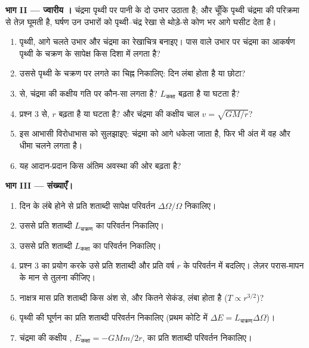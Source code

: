 \begin{problem}
\medskip
\noindent\textbf{भाग II --- ज्वारीय ।}
चंद्रमा पृथ्वी पर पानी के दो उभार उठाता है; और चूँकि पृथ्वी चंद्रमा की
परिक्रमा से तेज़ घूमती है, घर्षण उन उभारों को पृथ्वी--चंद्र रेखा से थोड़े-से
कोण भर आगे घसीट देता है।
\begin{enumerate}[resume]
  \item पृथ्वी, आगे चलते उभार और चंद्रमा का रेखाचित्र बनाइए। पास वाले
        उभार पर चंद्रमा का आकर्षण पृथ्वी के चक्रण के सापेक्ष किस दिशा में
        लगता है?
  \item उससे पृथ्वी के चक्रण पर लगते  का चिह्न निकालिए: दिन लंबा
        होता है या छोटा?
  \item {} से, चंद्रमा की कक्षीय गति पर कौन-सा 
        लगता है? $L_{\text{कक्षा}}$ बढ़ता है या घटता है?
  \item प्रश्न 3 से, $r$ बढ़ता है या घटता है? और चंद्रमा की कक्षीय चाल
        $v = \sqrt{GM/r}$?
  \item इस आभासी विरोधाभास को सुलझाइए: चंद्रमा को आगे धकेला जाता है, फिर
        भी अंत में वह और धीमा चलने लगता है।
  \item यह आदान-प्रदान किस अंतिम अवस्था की ओर बढ़ता है?
\end{enumerate}

\medskip
\noindent\textbf{भाग III --- संख्याएँ।}
\begin{enumerate}[resume]
  \item दिन के लंबे होने से प्रति शताब्दी सापेक्ष परिवर्तन
        $\Delta\Omega/\Omega$ निकालिए।
  \item उससे प्रति शताब्दी $L_{\text{चक्रण}}$ का परिवर्तन निकालिए।
  \item उससे प्रति शताब्दी $L_{\text{कक्षा}}$ का परिवर्तन निकालिए।
  \item प्रश्न 3 का प्रयोग करके उसे प्रति शताब्दी और प्रति वर्ष $r$ के
        परिवर्तन में बदलिए। लेज़र परास-मापन के मान से तुलना कीजिए।
  \item नाक्षत्र मास प्रति शताब्दी किस अंश से, और कितने सेकंड, लंबा होता
        है ($T \propto r^{3/2}$)?
  \item पृथ्वी की घूर्णन  का प्रति शताब्दी परिवर्तन निकालिए
        (प्रथम कोटि में $\Delta E = L_{\text{चक्रण}}\Delta\Omega$)।
  \item चंद्रमा की कक्षीय , $E_{\text{कक्षा}} = -GMm/2r$, का
        प्रति शताब्दी परिवर्तन निकालिए।
\end{enumerate}


\end{problem}

